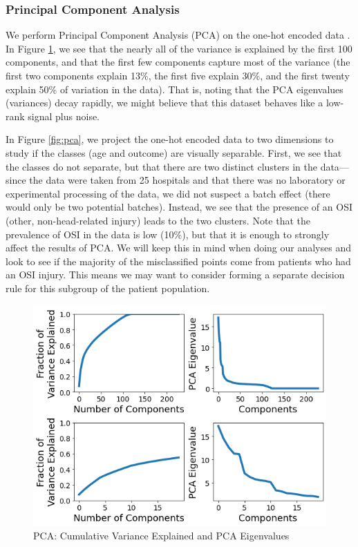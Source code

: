 \documentclass[11pt, letterpaper]{amsart}
\let\Oldsubsubsection\subsubsection
\renewcommand{\subsubsection}{\FloatBarrier\Oldsubsubsection}
\begin{document}
\subsubsection{Principal Component Analysis}

We perform Principal Component Analysis (PCA) on the one-hot encoded data \cite{pearson1901liii}. In Figure \ref{fig:pca_cum_var}, we see that the nearly all of the variance is explained by the first 100 components, and that the first few components capture most of the variance (the first two components explain 13\%, the first five explain 30\%, and the first twenty explain 50\% of variation in the data). That is, noting that the PCA eigenvalues (variances) decay rapidly, we might believe that this dataset behaves like a low-rank signal plus noise. 

In Figure \ref{fig:pca}, we project the one-hot encoded data to two dimensions to study if the classes (age and outcome) are visually separable. First, we see that the classes do not separate, but that there are two distinct clusters in the data---since the data were taken from 25 hospitals and that there was no laboratory or experimental processing of the data, we did not suspect a batch effect (there would only be two potential batches). Instead, we see that the presence of an OSI (other, non-head-related injury) leads to the two clusters. Note that the prevalence of OSI in the data is low (10\%), but that it is enough to strongly affect the results of PCA. We will keep this in mind when doing our analyses and look to see if the majority of the misclassified points come from patients who had an OSI injury. This means we may want to consider forming a separate decision rule for this subgroup of the patient population.
\begin{figure}
	\centering
	\includegraphics[width=\textwidth]{pca_cum_var.png}
	\caption{PCA: Cumulative Variance Explained and PCA Eigenvalues}\label{fig:pca_cum_var}
\end{figure}
\end{document}
